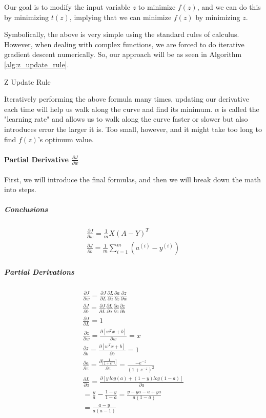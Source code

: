 \documentclass{article}
\newcommand{\myparagraph}[1]{\paragraph{#1}\mbox{}}
\newcommand{\mysubparagraph}[1]{\subparagraph{#1}\mbox{}}
\begin{document}
Our goal is to modify the input variable $z$ to minimize $f(z)$, and we can do this by minimizing $t(z)$, implying that we can minimize $f(z)$ by minimizing $z$.

Symbolically, the above is very simple using the standard rules of calculus.  However, when dealing with complex functions, we are forced to do iterative gradient descent numerically.  So, our approach will be as seen in Algorithm \ref{alg:z_update_rule}.

\begin{algorithm}[h]
\caption{Z Update Rule}
\label{alg:z_update_rule}
\end{algorithm}

Iteratively performing the above formula many times, updating our derivative each time will help us walk along the curve and find its minimum.  $\alpha$ is called the "learning rate" and allows us to walk along the curve faster or slower but also introduces error the larger it is.  Too small, however, and it might take too long to find $f(z)$'s optimum value.

\myparagraph{Partial Derivative $\frac{\partial{J}}{\partial{w}}$}

First, we will introduce the final formulas, and then we will break down the math into steps.

\mysubparagraph{Conclusions}

\begin{gather}
\frac{\partial{J}}{\partial{w}} = \frac{1}{m}X(A-Y)^{T} \\
%
\frac{\partial{J}}{\partial{b}} = \frac{1}{m} \sum_{i=1}^{m}(a^{(i)} - y^{(i)})
\end{gather}

\mysubparagraph{Partial Derivations}

\begin{gather}
\frac{\partial{J}}{\partial{w}} = \frac{\partial{J}}{\partial{L}}\frac{\partial{L}}{\partial{a}}\frac{\partial{a}}{\partial{z}}\frac{\partial{z}}{\partial{w}} \label{eqn:dJ_dw} \\
%
\frac{\partial{J}}{\partial{b}} = \frac{\partial{J}}{\partial{L}}\frac{\partial{L}}{\partial{a}}\frac{\partial{a}}{\partial{z}}\frac{\partial{z}}{\partial{b}} \label{eqn:dJ_db} \\
%
\frac{\partial{J}}{\partial{L}} = 1 \\
%
\frac{\partial{z}}{\partial{w}} = \frac{\partial{[w^T x + b]}}{\partial{w}} = x \\
%
\frac{\partial{z}}{\partial{b}} = \frac{\partial{[w^{T} x + b]}}{\partial{b}} = 1 \\
%
\frac{\partial{a}}{\partial{z}} = \frac{\partial{[\frac{1}{1 + e^{-z}}}]}{\partial{z}} = \frac{-e^{-z}}{(1+e^{-z})^{2}} \\
%
\frac{\partial{L}}{\partial{a}} = \frac{\partial{[y\ log(a) + (1-y) log (1-a)]}}{\partial{a}} \\
= \frac{y}{a} - \frac{1-y}{1-a} = \frac{y-ya-a+ya}{a(1-a)} \\
= \frac{a-y}{a(a-1)}
\end{gather}
\end{document}
